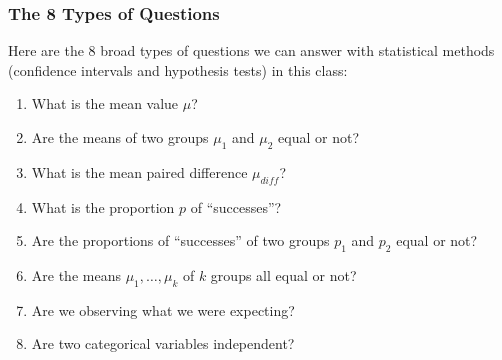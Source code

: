 \documentclass[handout]{beamer}
\newcommand{\blue}[1]{\textcolor{blue2}{#1}}
\begin{document}
\begin{frame}
\frametitle{The 8 Types of Questions}

Here are the 8 broad types of questions we can answer with statistical methods (confidence intervals and hypothesis tests) in this class: 

\vspace{0.25cm}

\begin{enumerate}
\pause\item What is the mean value $\mu$?
\pause\item Are the means of two groups $\mu_1$ and $\mu_2$ equal or not?
\pause\item What is the mean paired difference $\mu_{diff}$?
\pause\item What is the proportion $p$ of ``successes''?
\pause\item Are the proportions of ``successes'' of two groups $p_1$ and $p_2$ equal or not?
\pause\item Are the means $\mu_1, \ldots, \mu_k$ of $k$ groups \blue{all} equal or not?
\pause\item Are we observing what we were expecting?
\pause\item Are two categorical variables independent?
\end{enumerate}

\end{frame}
\end{document}
